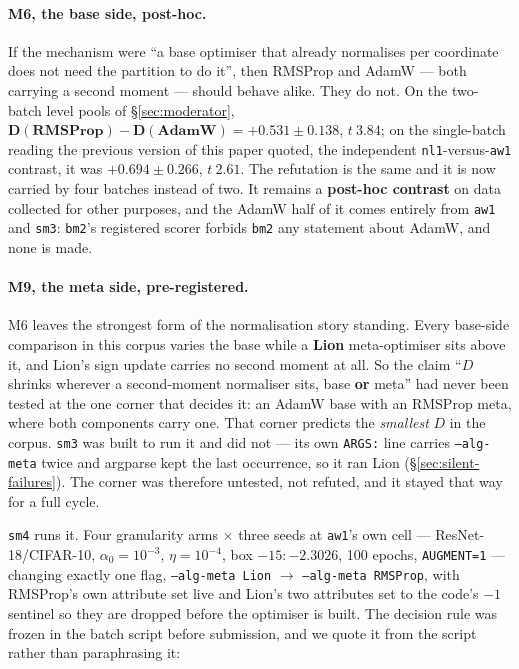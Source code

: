 \documentclass[10pt,letterpaper]{article}
\newcommand{\Dstat}{D}                         %
\newcommand{\arm}[1]{\texttt{#1}}
\begin{document}
\paragraph{M6, the base side, post-hoc.}
If the mechanism were ``a base optimiser that already normalises per coordinate does not need the
partition to do it'', then RMSProp and AdamW --- both carrying a second moment --- should behave
alike. They do not. On the two-batch level pools of \S\ref{sec:moderator},
$\mathbf{\Dstat(\text{RMSProp}) - \Dstat(\text{AdamW}) = +0.531 \pm 0.138}$, $t\ 3.84$; on the
single-batch reading the previous version of this paper quoted, the independent \arm{nl1}-versus-\arm{aw1}
contrast, it was $+0.694 \pm 0.266$, $t\ 2.61$. The refutation is the same and it is now carried
by four batches instead of two. It remains a \textbf{post-hoc contrast} on data collected for
other purposes, and the AdamW half of it comes entirely from \arm{aw1} and \arm{sm3}: \arm{bm2}'s
registered scorer forbids \arm{bm2} any statement about AdamW, and none is made.

\paragraph{M9, the meta side, pre-registered.}
M6 leaves the strongest form of the normalisation story standing. Every base-side comparison in
this corpus varies the base while a \textbf{Lion} meta-optimiser sits above it, and Lion's sign
update carries no second moment at all. So the claim ``$\Dstat$ shrinks wherever a second-moment
normaliser sits, base \textbf{or} meta'' had never been tested at the one corner that decides it:
an AdamW base with an RMSProp meta, where both components carry one. That corner predicts the
\emph{smallest} $\Dstat$ in the corpus. \arm{sm3} was built to run it and did not --- its own
\texttt{ARGS:} line carries \texttt{--alg-meta} twice and argparse kept the last occurrence, so it
ran Lion (\S\ref{sec:silent-failures}). The corner was therefore untested, not refuted, and it
stayed that way for a full cycle.

\arm{sm4} runs it. Four granularity arms $\times$ three seeds at \arm{aw1}'s own cell ---
ResNet-18/CIFAR-10, $\alpha_0 = 10^{-3}$, $\eta = 10^{-4}$, box $-15{:}{-}2.3026$, 100 epochs,
\texttt{AUGMENT=1} --- changing exactly one flag, \texttt{--alg-meta Lion} $\rightarrow$
\texttt{--alg-meta RMSProp}, with RMSProp's own attribute set live and Lion's two attributes set
to the code's $-1$ sentinel so they are dropped before the optimiser is built. The decision rule
was frozen in the batch script before submission, and we quote it from the script rather than
paraphrasing it:
\end{document}
